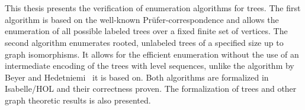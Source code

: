 \chapter{\abstractname}

This thesis presents the verification of enumeration algorithms for trees.
The first algorithm is based on the well-known Prüfer-correspondence and allows the enumeration of all possible labeled trees over a fixed finite set of vertices.
The second algorithm enumerates rooted, unlabeled trees of a specified size up to graph isomorphisms.
It allows for the efficient enumeration without the use of an intermediate encoding of the trees with level sequences, unlike the algorithm by Beyer and Hedetniemi~\cite{beyer} it is based on.
Both algorithms are formalized in Isabelle/HOL and their correctness proven.
The formalization of trees and other graph theoretic results is also presented.